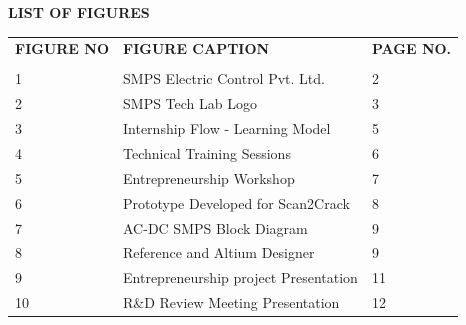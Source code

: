 \documentclass[12pt,a4paper,twocolumn,fleqn]{article}
\begin{document}
\newpage
\begin{center}
{\Large \textbf{LIST OF FIGURES}}\\[1cm]
\end{center}
\begin{center}
\begin{tabular}{p{3cm}p{8cm}p{5cm}}
\textbf{FIGURE NO}&\textbf{FIGURE CAPTION} & \textbf{PAGE NO.} \\
\\
     1& SMPS Electric Control Pvt. Ltd.& 2\\
2&SMPS Tech Lab Logo &    3\\
3&Internship Flow - Learning Model & 5 \\
4&Technical Training Sessions & 6 \\
5& Entrepreneurship Workshop & 7 \\
6&Prototype Developed for Scan2Crack  & 8 \\
7& AC-DC SMPS Block Diagram & 9 \\
8&Reference and Altium Designer & 9 \\
9&Entrepreneurship project Presentation & 11\\
10&R\&D Review Meeting Presentation & 12 \\
\end{tabular}
 \end{center}
\end{document}
